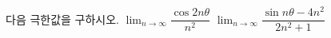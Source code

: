 다음 극한값을 구하시오. 
 $\displaystyle\lim_{n\to\infty}\dfrac{\cos 2n\theta}{n^2}$
 $\displaystyle\lim_{n\to\infty}\dfrac{\sin n\theta-4n^2}{2n^2+1}$
